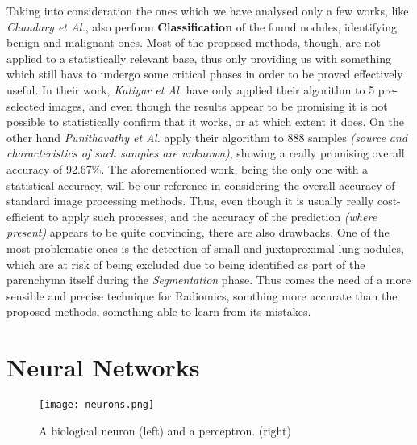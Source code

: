\documentclass[../main.tex]{subfiles}
\begin{document}
Taking into consideration the ones which we have analysed only a few works, like \textit{Chaudary et Al.}\cite{Chaudhary2012}, also perform \textbf{Classification} of the found nodules, identifying benign and malignant ones.
Most of the proposed methods, though, are not applied to a statistically relevant base, thus only providing us with something which still havs to undergo some critical phases in order to be proved effectively useful. In their work, \textit{Katiyar et Al.} have only applied their algorithm to 5 pre-selected images, and even though the results appear to be promising it is not possible to statistically confirm that it works, or at which extent it does.\cite{Amutha2013} On the other hand \textit{Punithavathy et Al.} apply their algorithm to 888 samples \textit{(source and characteristics of such samples are unknown)}, showing a really promising overall accuracy of 92.67\%.\cite{Punithavathy2015} The aforementioned work, being the only one with a statistical accuracy, will be our reference in considering the overall accuracy of standard image processing methods.
Thus, even though it is usually really cost-efficient to apply such processes, and the accuracy of the prediction \textit{(where present)} appears to be quite convincing, there are also drawbacks. One of the most problematic ones is the detection of small and juxtaproximal lung nodules, which are at risk of being excluded due to being identified as part of the parenchyma itself during the \textit{Segmentation} phase. Thus comes the need of a more sensible and precise technique for Radiomics, somthing more accurate than the proposed methods, something able to learn from its mistakes. 

\vspace{5mm}
\section{Neural Networks}
\begin{figure}[!b]
  \centering
  \texttt{[image: neurons.png]}
  \caption{A biological neuron (left) and a perceptron. (right)}
  \label{fig:neuron}
\end{figure}
\end{document}
